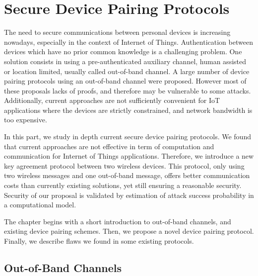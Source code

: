 
\chapter{Secure Device Pairing Protocols} %

\label{Chapter2} %



The need to secure communications between personal devices is increasing nowadays, especially in the context of Internet of Things. Authentication between devices which have no prior common knowledge is a challenging problem. One solution consists in using a pre-authenticated auxiliary channel, human assisted or location limited, usually called out-of-band channel. A large number of device pairing protocols using an out-of-band channel were proposed. However most of these proposals lacks of proofs, and therefore may be vulnerable to some attacks. Additionally, current approaches are not sufficiently convenient for IoT applications where the devices are strictly constrained, and network bandwidth is too expensive. 

In this part, we study in depth current secure device pairing protocols. We found that current approaches are not effective in term of computation and communication for Internet of Things applications. Therefore, we introduce a new key agreement protocol between two wireless devices. This protocol, only using two wireless messages and one out-of-band message, offers better communication costs than currently existing solutions, yet still ensuring a reasonable security. Security of our proposal is validated by estimation of attack success probability in a computational model.  


The chapter begins with a short introduction to out-of-band channels, and existing device pairing schemes. Then, we propose a novel device pairing protocol.  Finally, we describe flaws we found in some existing protocols. 


\section{Out-of-Band Channels}

